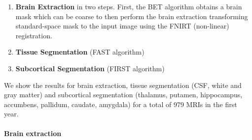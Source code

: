 \documentclass[11pt]{article}
\theoremstyle{definition}
\theoremstyle{remark}
\begin{document}
\begin{enumerate}
  \item \textbf{Brain Extraction} in two steps. First, the BET algorithm obtains a brain mask which can be coarse to then perform the brain extraction transforming standard-space mask to the input image using the FNIRT (non-linear) registration.
  \item \textbf{Tissue Segmentation} (FAST algorithm)
  \item \textbf{Subcortical Segmentation} (FIRST algorithm)
\end{enumerate}

We show the results for brain extraction, tissue segmentation (CSF, white and gray matter) and subcortical segmentation (thalamus, putamen, hippocampus, accumbens, pallidum, caudate, amygdala) for a total of 979 MRIs in the first year. 

\paragraph*{Brain extraction}
\end{document}
